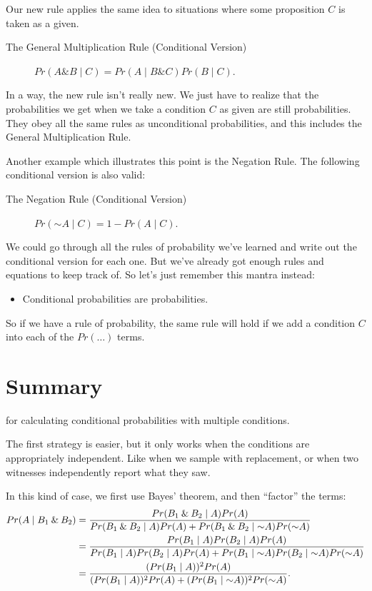 \documentclass[justified]{tufte-book}
\newcommand{\given}{\mid}
\renewcommand{\neg}{\mathbin{\sim}}
\renewcommand{\wedge}{\mathbin{\&}}
\newcommand{\p}{Pr}
\newenvironment{info}{\begin{itemize}\item[\Info]}{\end{itemize}}
\theoremstyle{definition}
\theoremstyle{definition}
\theoremstyle{definition}
\theoremstyle{remark}
\begin{document}
Our new rule applies the same idea to situations where some proposition
\(C\) is taken as a given.

\begin{description}
\item[The General Multiplication Rule (Conditional Version)]
\(\p(A \wedge B \given C) = \p(A \given B \wedge C) \p(B \given C).\)
\end{description}

In a way, the new rule isn't really new. We just have to realize that
the probabilities we get when we take a condition \(C\) as given are
still probabilities. They obey all the same rules as unconditional
probabilities, and this includes the General Multiplication Rule.

Another example which illustrates this point is the Negation Rule. The
following conditional version is also valid:

\begin{description}
\item[The Negation Rule (Conditional Version)]
\(\p(\neg A \given C) = 1 - \p(A \given C).\)
\end{description}

We could go through all the rules of probability we've learned and write
out the conditional version for each one. But we've already got enough
rules and equations to keep track of. So let's just remember this mantra
instead:

\begin{info}
Conditional probabilities are probabilities.
\end{info}

So if we have a rule of probability, the same rule will hold if we add a
condition \(C\) into each of the \(\p(\ldots)\) terms.

\hypertarget{summary-2}{%
\section{Summary}\label{summary-2}}

 for calculating conditional
probabilities with multiple conditions.

The first strategy is easier, but it only works when the conditions are
appropriately independent. Like when we sample with replacement, or when
two witnesses independently report what they saw.

In this kind of case, we first use Bayes' theorem, and then ``factor''
the terms: \[
  \begin{aligned}
    \p(A \given B_1 \wedge B_2) &= 
      \frac{\p(B_1 \wedge B_2 \given A)\p(A)}{%
            \p(B_1 \wedge B_2 \given A)\p(A) +%
              \p(B_1 \wedge B_2 \given \neg A)\p(\neg A)}\\
      &= \frac{\p(B_1 \given A)\p(B_2 \given A)\p(A)}{%
                \p(B_1 \given A)\p(B_2 \given A)\p(A) +%
                  \p(B_1 \given \neg A)\p(B_2 \given \neg A)\p(\neg A)}\\
      &= \frac{(\p(B_1 \given A))^2\p(A)}{%
                (\p(B_1 \given A))^2\p(A) +%
                  (\p(B_1 \given \neg A))^2\p(\neg A)}.
  \end{aligned}
\]
\end{document}
